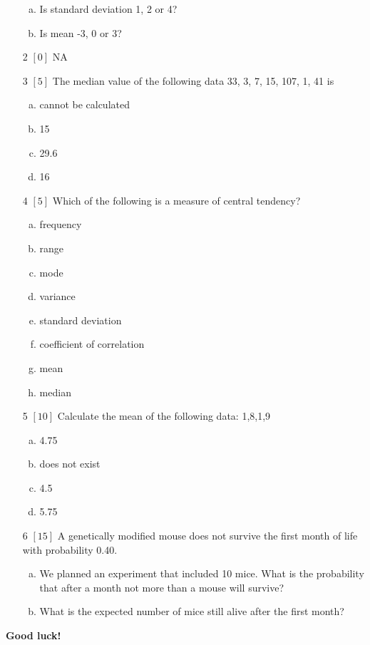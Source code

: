 \documentclass{article}
\begin{document}
\begin{itemize}
\begin{enumerate}[(a)]
\item Is standard deviation 1, 2 or 4? 
\vspace{\baselineskip}\item Is mean -3, 0 or 3? 
\vspace{\baselineskip}\end{enumerate}
\item[2] {\small $\left[0\right]$ }NA
\item[3] {\small $\left[5\right]$ }The median value of the following data 33, 3, 7, 15, 107, 1, 41 is
\begin{enumerate}[(a)]
\item cannot be calculated 
\item 15 
\item 29.6 
\item 16 
\end{enumerate}
\item[4] {\small $\left[5\right]$ }Which of the following is a measure of central tendency?
\begin{enumerate}[(a)]
\item frequency 
\item range 
\item mode 
\item variance 
\item standard deviation 
\item coefficient of correlation 
\item mean 
\item median 
\end{enumerate}
\item[5] {\small $\left[10\right]$ }Calculate the mean of the following data:  
1,8,1,9\begin{enumerate}[(a)]
\item  4.75  
\item does not exist 
\item 4.5  
\item 5.75  
\end{enumerate}
\item[6] {\small $\left[15\right]$ }A genetically modified mouse does not survive the first month of life with probability 0.40.  
\begin{enumerate}[(a)]
\item We planned an experiment that included 10 mice. What is the probability that after a month not more than a mouse will survive? 
\vspace{\baselineskip} \vspace{\baselineskip} \vspace{\baselineskip}\item What is the expected number of mice still alive after the first month? 
\vspace{\baselineskip} \vspace{\baselineskip}\end{enumerate}
\end{itemize}
{\bf Good luck! }\newpage
\end{document}
